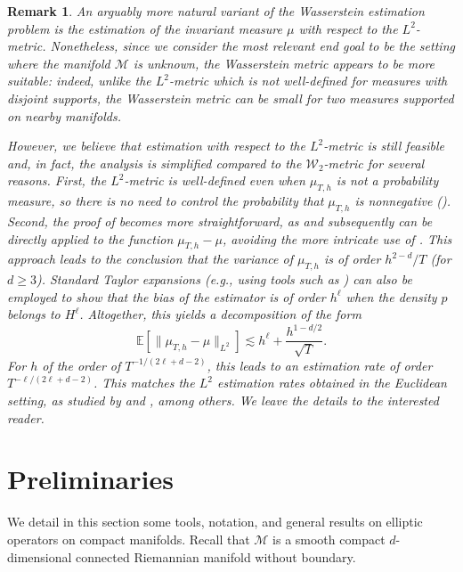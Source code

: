 \documentclass[10pt,a4paper]{article}
\newcommand{\E}{{\mathbb E}}
\newcommand\cM{\mathcal{M}}
\newcommand\cW{\mathcal{W}}
\let \ssection=\section
\renewcommand{\section}{\setcounter{equation}{0}\ssection}
\newtheorem{remark}[theorem]{Remark}
\begin{document}
\begin{remark}
{
An arguably more natural variant of the Wasserstein estimation problem is the estimation of the invariant measure $\mu$ with respect to the $L^2$-metric. Nonetheless, since we consider the most relevant end goal to be the setting where the manifold $\cM$ is unknown, the Wasserstein metric appears to be more suitable: indeed, unlike the $L^2$-metric which is not well-defined for measures with disjoint supports, the Wasserstein metric can be small for two measures supported on  nearby manifolds. }

{
However, we believe that estimation with respect to the $L^2$-metric is still feasible and, in fact, the analysis is simplified compared to the $\cW_2$-metric for several reasons. First, the $L^2$-metric is well-defined even when $\mu_{T,h}$ is not a probability measure, so there is no need to control the probability that $\mu_{T,h}$ is nonnegative (). Second, the proof of  becomes more straightforward, as  and subsequently  can be directly applied to the function $\mu_{T,h} - \mu$, avoiding the more intricate use of . This approach leads to the conclusion that the variance of $\mu_{T,h}$ is of order $h^{2-d}/T$ (for $d \ge 3$). Standard Taylor expansions (e.g., using tools such as \cite[Lemma 10]{Divol2022}) can also be employed to show that the bias of the estimator is of order $h^\ell$ when the density $p$ belongs to $H^\ell$. Altogether, this yields a decomposition of the form
\begin{equation}
    \E[\|\mu_{T,h} - \mu\|_{L^2}] \lesssim h^\ell + \frac{h^{1 - d/2}}{\sqrt{T}}.
\end{equation}
For $h$ of the order of $T^{-1/(2\ell + d - 2)}$, this leads to an estimation rate of order $T^{-\ell/(2\ell + d - 2)}$. This matches the $L^2$ estimation rates obtained in the Euclidean setting, as studied by \cite{dalalyan2006asymptotic, dalalyan2007asymptotic} and \cite{amorinogloter}, among others. We leave the details to the interested reader.
}
\end{remark}


\section{Preliminaries}\label{sec:preliminaries}

We detail in this section some tools, notation, and general results on elliptic operators on compact manifolds. Recall that $\cM$ is a smooth compact $d$-dimensional connected Riemannian manifold without boundary. 
\end{document}
